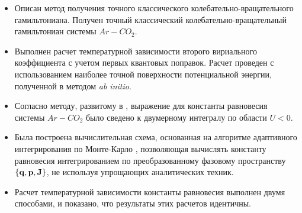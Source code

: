 \begin{itemize}
 \item Описан метод получения точного классического колебательно-вращательного гамильтониана. Получен точный классический колебательно-вращательный гамильтониан системы $Ar-CO_2$.
 \item Выполнен расчет температурной зависимости второго вириального коэффициента с учетом первых квантовых поправок. Расчет проведен с использованием наиболее точной поверхности потенциальной энергии, полученной в \cite{kalugina2017} методом \textit{ab initio}.  
 \item Согласно методу, развитому в \cite{vigasin2015}, выражение для константы равновесия системы $Ar-CO_2$ было сведено к двумерному интегралу по области $U < 0$. 
 \item Была построена вычислительная схема, основанная на алгоритме адаптивного интегрирования по Монте-Карло \cite{lepage1978, vegas}, позволяющая вычислять константу равновесия интегрированием по преобразованному фазовому пространству $\left\{ \mathbf{q}, \mathbf{p}, \mathbf{J} \right\}$, не используя упрощающих аналитических техник. 
  \item Расчет температурной зависимости константы равновесия выполнен двумя способами, и показано, что результаты этих расчетов идентичны.
\end{itemize}


